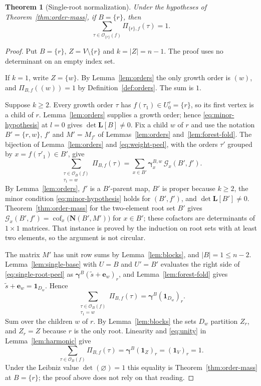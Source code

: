 \documentclass[11pt]{article}
\newtheorem{theorem}[definition]{Theorem}
\newcommand{\one}{\mathbf 1}
\newcommand{\Lmat}{\mathbf L}
\newcommand{\Nmat}{\mathbf N}
\newcommand{\gam}{\boldsymbol\gamma}
\newcommand{\Ord}{\mathcal O}
\newcommand{\cof}{\operatorname{cof}}
\begin{document}
\begin{theorem}[Single-root normalization]\label{thm:single-root}
Under the hypotheses of Theorem~\ref{thm:order-mass}, if
$B=\{r\}$, then
\[
\sum_{\tau\in\Ord_{\{r\}}(f)}\Pi_{\{r\},f}(\tau)=1.
\]
\end{theorem}
\begin{proof}
Put $B=\{r\}$, $Z=V\setminus\{r\}$ and $k=|Z|=n-1$. The proof
uses no determinant on an empty index set.

If $k=1$, write $Z=\{w\}$. By Lemma~\ref{lem:orders} the only
growth order is $(w)$, and $\Pi_{B,f}((w))=1$ by
Definition~\ref{def:orders}. The sum is $1$.

Suppose $k\geq2$. Every growth order $\tau$ has
$f(\tau_1)\in U_0^\tau=\{r\}$, so its first vertex is a child of
$r$. Lemma~\ref{lem:orders} supplies a growth order; hence
\eqref{eq:minor-hypothesis} at $l=0$ gives $\det\Lmat[B]\neq0$.
Fix a child $w$ of $r$ and use the notation $B'=\{r,w\}$, $f'$ and
$M'=M_{f'}$ of Lemmas~\ref{lem:orders} and~\ref{lem:forest-fold}.
The bijection of Lemma~\ref{lem:orders} and \eqref{eq:weight-peel},
with the orders $\tau'$ grouped by $x=f(\tau'_1)\in B'$, give
\begin{equation}\label{eq:single-root-peel}
\sum_{\substack{\tau\in\Ord_B(f)\\ \tau_1=w}}\Pi_{B,f}(\tau)
=\sum_{x\in B'}\gam^{B,w}_x\,\mathcal G_x(B',f').
\end{equation}
By Lemma~\ref{lem:orders}, $f'$ is a $B'$-parent map, $B'$ is
proper because $k\geq2$, the minor condition
\eqref{eq:minor-hypothesis} holds for $(B',f')$, and
$\det\Lmat[B']\neq0$. Theorem~\ref{thm:order-mass} for the
two-element root set $B'$ gives
$\mathcal G_x(B',f')=\cof_x\bigl(\Nmat(B',M')\bigr)$ for
$x\in B'$; these cofactors are determinants of $1\times1$
matrices. That instance is proved by the induction on root sets
with at least two elements, so the argument is not circular.

The matrix $M'$ has unit row sums by Lemma~\ref{lem:blocks}, and
$|B|=1\leq n-2$. Lemma~\ref{lem:single-base} with $U=B$ and
$U'=B'$ evaluates the right side of \eqref{eq:single-root-peel}
as $\gam^B(\widetilde s+\mathbf e_w)_r$, and
Lemma~\ref{lem:forest-fold} gives
$\widetilde s+\mathbf e_w=\mathbf1_{D_w}$. Hence
\[
\sum_{\substack{\tau\in\Ord_B(f)\\ \tau_1=w}}\Pi_{B,f}(\tau)
=\gam^B(\mathbf1_{D_w})_r .
\]
Sum over the children $w$ of $r$. By Lemma~\ref{lem:blocks} the
sets $D_w$ partition $Z_r$, and $Z_r=Z$ because $r$ is the only
root. Linearity and \eqref{eq:unity} in Lemma~\ref{lem:harmonic}
give
\[
\sum_{\tau\in\Ord_B(f)}\Pi_{B,f}(\tau)
=\gam^B(\mathbf1_Z)_r=(\one_V)_r=1 .
\]
Under the Leibniz value $\det(\varnothing)=1$ this equality is
Theorem~\ref{thm:order-mass} at $B=\{r\}$; the proof above does
not rely on that reading.
\end{proof}
\end{document}
